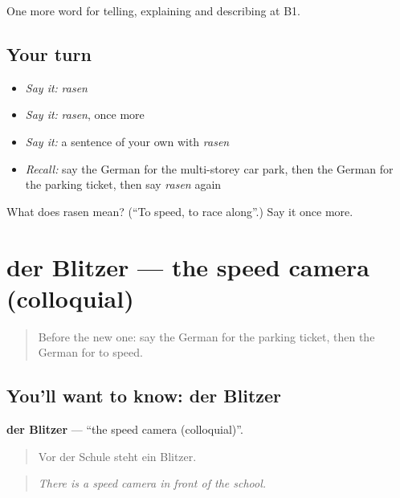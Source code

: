 \begin{grammarlens}[title={What you've built}]
One more word for telling, explaining and describing at B1.
\end{grammarlens}

\subsection*{Your turn}
\begin{itemize}
\raggedright
  \item \emph{Say it:} \emph{rasen}
  \item \emph{Say it:} \emph{rasen}, once more
  \item \emph{Say it:} a sentence of your own with \emph{rasen}
  \item \emph{Recall:} say the German for the multi-storey car park, then the German for the parking ticket, then say \emph{rasen} again
\end{itemize}

\begin{tcolorbox}[breakable,colback=teal!4,colframe=teal!35!black,title={Before you move on}]
What does rasen mean? (\textquotedblleft{}To speed, to race along\textquotedblright{}.) Say it once more.
\end{tcolorbox}
\section[der Blitzer]{der Blitzer — the speed camera (colloquial)}

\label{lesson:GE-C407-blitzer}



\begin{quote}
Before the new one: say the German for the parking ticket, then the German for to speed.
\end{quote}

\subsection*{You'll want to know: der Blitzer}
\textbf{der Blitzer} — \textquotedblleft{}the speed camera (colloquial)\textquotedblright{}.

\begin{quote}
Vor der Schule steht ein Blitzer.
\end{quote}

\begin{quote}
\emph{There is a speed camera in front of the school.}
\end{quote}

